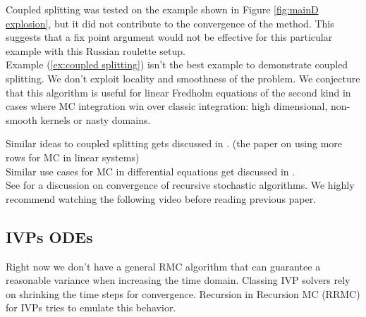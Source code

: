\documentclass[a4paper,12pt]{article}
\begin{document}
Coupled splitting was tested on the example shown in Figure
\ref{fig:mainD explosion}, but it did not contribute to the
convergence of the method. This suggests that a fix point argument
would not be effective for this particular example with this
Russian roulette setup. \\

Example (\ref{ex:coupled splitting}) isn't the best example to demonstrate
coupled splitting. We don't exploit locality and smoothness of the problem.
We conjecture that this algorithm is useful for
linear Fredholm equations of the second kind in cases where MC integration win
over classic integration: high dimensional, non-smooth kernels or
nasty domains.

\begin{related}
    Similar ideas to coupled splitting gets discussed in
    \cite{sabelfeld_sparsified_2009}. (the paper on using more rows
    for MC in linear systems) \\

    Similar use cases for MC in differential equations get discussed in
    \cite{jentzen_random_2009}. \\

    See \cite{gupta_convergence_2021} for a discussion on convergence
    of recursive stochastic algorithms. We highly recommend watching
    the following video \cite{abhishek_gupta_recursive_2020} before reading
    previous paper.
\end{related}


\subsection{IVPs ODEs}

Right now we don't have a general RMC algorithm that can
guarantee a reasonable variance when increasing the time domain.
Classing IVP solvers rely on shrinking the time steps for
convergence. Recursion in Recursion MC (RRMC) for IVPs tries to emulate
this behavior.
\end{document}
